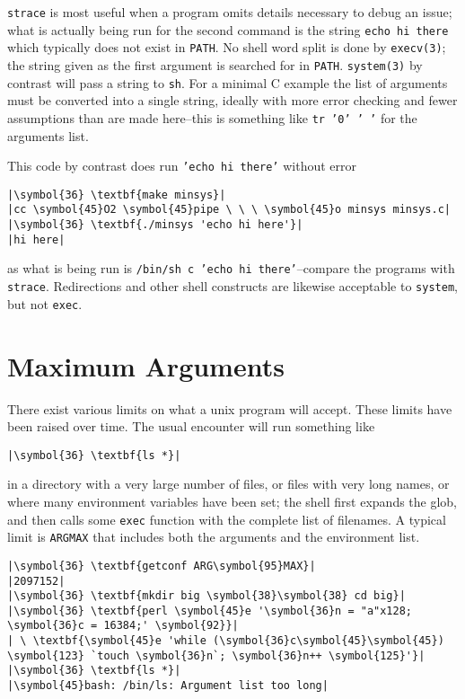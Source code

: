 \documentclass[10pt,a4paper]{article}
\begin{document}
\texttt{strace} is most useful when a program omits details necessary to
debug an issue; what is actually being run for the second command is the
string \texttt{echo hi there} which typically does not exist in
\texttt{PATH}. No shell word split is done by \texttt{execv(3)}; the
string given as the first argument is searched for in \texttt{PATH}.
\texttt{system(3)} by contrast will pass a string to \texttt{sh}. For a
minimal C example the list of arguments must be converted into a single
string, ideally with more error checking and fewer assumptions than are
made here--this is something like \texttt{tr '0' ' '} for the
arguments list.



This code by contrast does run \texttt{'echo hi there'} without error

\begin{lstlisting}
|\symbol{36} \textbf{make minsys}|
|cc \symbol{45}O2 \symbol{45}pipe \ \ \ \symbol{45}o minsys minsys.c|
|\symbol{36} \textbf{./minsys 'echo hi here'}|
|hi here|
\end{lstlisting}

as what is being run is \texttt{/bin/sh c 'echo hi
there'}--compare the programs with \texttt{strace}. Redirections and
other shell constructs are likewise acceptable to \texttt{system}, but
not \texttt{exec}.

\section*{Maximum Arguments}

There exist various limits on what a unix program will accept. These
limits have been raised over time. The usual encounter will run
something like

\begin{lstlisting}
|\symbol{36} \textbf{ls *}|
\end{lstlisting}

in a directory with a very large number of files, or files with very
long names, or where many environment variables have been set; the shell
first expands the glob, and then calls some \texttt{exec} function with
the complete list of filenames. A typical limit is
\texttt{ARGMAX} that includes both the arguments and the
environment list.

\begin{lstlisting}
|\symbol{36} \textbf{getconf ARG\symbol{95}MAX}|
|2097152|
|\symbol{36} \textbf{mkdir big \symbol{38}\symbol{38} cd big}|
|\symbol{36} \textbf{perl \symbol{45}e '\symbol{36}n = "a"x128; \symbol{36}c = 16384;' \symbol{92}}|
| \ \textbf{\symbol{45}e 'while (\symbol{36}c\symbol{45}\symbol{45}) \symbol{123} `touch \symbol{36}n`; \symbol{36}n++ \symbol{125}'}|
|\symbol{36} \textbf{ls *}|
|\symbol{45}bash: /bin/ls: Argument list too long|
\end{lstlisting}
\end{document}
